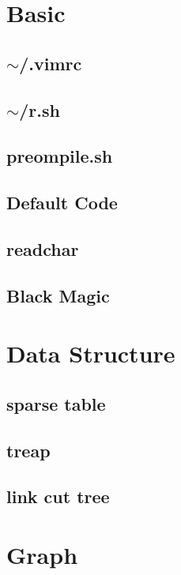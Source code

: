 
\section{Basic}
\subsection{$\sim$/.vimrc}

\subsection{$\sim$/r.sh}

\subsection{preompile.sh}

\subsection{Default Code}

\subsection{readchar}

\subsection{Black Magic}


\section{Data Structure}
\subsection{sparse table}

\subsection{treap}

\subsection{link cut tree}


\section{Graph}
